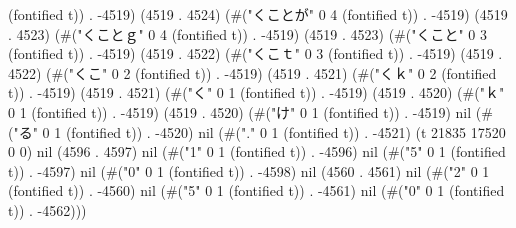 (fontified t)) . -4519) (4519 . 4524) (#("くことが" 0 4 (fontified t)) . -4519) (4519 . 4523) (#("くことｇ" 0 4 (fontified t)) . -4519) (4519 . 4523) (#("くこと" 0 3 (fontified t)) . -4519) (4519 . 4522) (#("くこｔ" 0 3 (fontified t)) . -4519) (4519 . 4522) (#("くこ" 0 2 (fontified t)) . -4519) (4519 . 4521) (#("くｋ" 0 2 (fontified t)) . -4519) (4519 . 4521) (#("く" 0 1 (fontified t)) . -4519) (4519 . 4520) (#("ｋ" 0 1 (fontified t)) . -4519) (4519 . 4520) (#("け" 0 1 (fontified t)) . -4519) nil (#("る" 0 1 (fontified t)) . -4520) nil (#("." 0 1 (fontified t)) . -4521) (t 21835 17520 0 0) nil (4596 . 4597) nil (#("1" 0 1 (fontified t)) . -4596) nil (#("5" 0 1 (fontified t)) . -4597) nil (#("0" 0 1 (fontified t)) . -4598) nil (4560 . 4561) nil (#("2" 0 1 (fontified t)) . -4560) nil (#("5" 0 1 (fontified t)) . -4561) nil (#("0" 0 1 (fontified t)) . -4562)))
